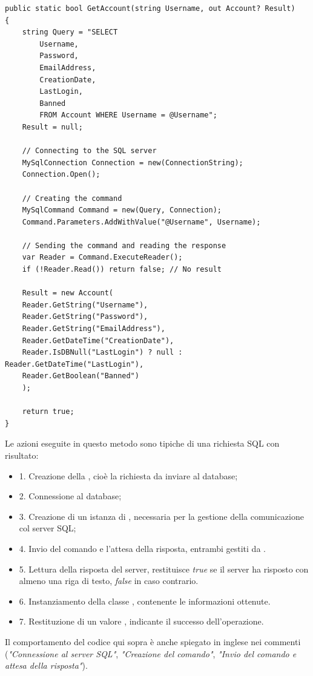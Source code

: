 \documentclass[12pt]{report}
\begin{document}
\begin{verbatim}
public static bool GetAccount(string Username, out Account? Result)
{
	string Query = "SELECT 
		Username, 
		Password, 
		EmailAddress, 
		CreationDate, 
		LastLogin, 
		Banned 
		FROM Account WHERE Username = @Username";
	Result = null;
	
	// Connecting to the SQL server
	MySqlConnection Connection = new(ConnectionString);
	Connection.Open();
	
	// Creating the command
	MySqlCommand Command = new(Query, Connection);
	Command.Parameters.AddWithValue("@Username", Username);
	
	// Sending the command and reading the response
	var Reader = Command.ExecuteReader();
	if (!Reader.Read()) return false; // No result
	
	Result = new Account(
	Reader.GetString("Username"),
	Reader.GetString("Password"),
	Reader.GetString("EmailAddress"),
	Reader.GetDateTime("CreationDate"),
	Reader.IsDBNull("LastLogin") ? null : Reader.GetDateTime("LastLogin"),
	Reader.GetBoolean("Banned")
	);
	
	return true;
}
\end{verbatim}
Le azioni eseguite in questo metodo sono tipiche di una richiesta SQL con risultato:
\begin{itemize}
	\item 1. Creazione della , cioè la richiesta da inviare al database;
	\item 2. Connessione al database;
	\item 3. Creazione di un istanza di , necessaria per la gestione della comunicazione col server SQL;
	\item 4. Invio del comando e l'attesa della risposta, entrambi gestiti da .
	\item 5. Lettura della risposta del server,  restituisce \textit{true} se il server ha risposto con almeno una riga di testo, \textit{false} in caso contrario.
	\item 6. Instanziamento della classe , contenente le informazioni ottenute.
	\item 7. Restituzione di un valore , indicante il successo dell'operazione.
\end{itemize}
Il comportamento del codice qui sopra è anche spiegato in inglese nei commenti (\textit{"Connessione al server SQL"}, \textit{"Creazione del comando"}, \textit{"Invio del comando e attesa della risposta"}).
\end{document}
